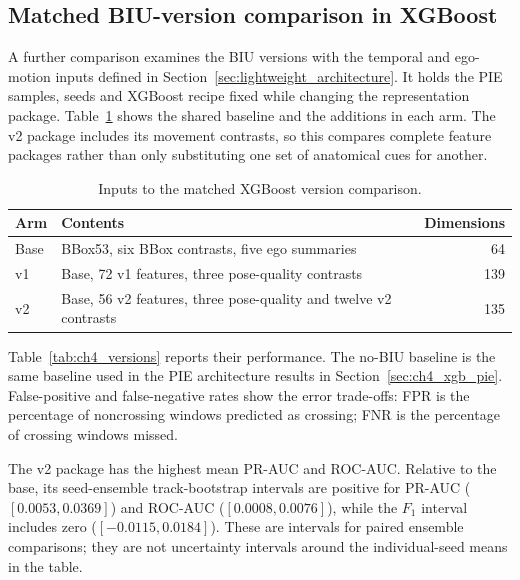 \subsection{Matched BIU-version comparison in XGBoost}\label{sec:ch4_versions}

A further comparison examines the BIU versions with the temporal and ego-motion
inputs defined in Section~\ref{sec:lightweight_architecture}. It holds the PIE samples,
seeds and XGBoost recipe fixed while changing the representation package. Table~\ref{tab:matched_xgb_arms}
shows the shared baseline and the additions in each arm. The v2 package includes
its movement contrasts, so this compares complete feature packages rather than only
substituting one set of anatomical cues for another.

\begin{table}[!htbp]
\centering
\caption{Inputs to the matched XGBoost version comparison.}
\label{tab:matched_xgb_arms}


\begin{tabularx}{\textwidth}{@{}>{\RaggedRight\arraybackslash}p{}Xr@{}}
\toprule
\textbf{Arm} & \textbf{Contents} & \textbf{Dimensions} \\[3pt]
\midrule
Base & BBox53, six BBox contrasts, five ego summaries & 64 \\[3pt]
v1 & Base, 72 v1 features, three pose-quality contrasts & 139 \\[3pt]
v2 & Base, 56 v2 features, three pose-quality and twelve v2 contrasts & 135 \\[3pt]
\bottomrule
\end{tabularx}
\end{table}


Table~\ref{tab:ch4_versions} reports their performance. The no-BIU baseline is the
same baseline used in the PIE architecture results in Section~\ref{sec:ch4_xgb_pie}. False-positive and false-negative rates
show the error trade-offs: FPR is the percentage of noncrossing windows predicted as
crossing; FNR is the percentage of crossing windows missed.


The v2 package has the highest mean PR-AUC and ROC-AUC. Relative to the base, its
seed-ensemble track-bootstrap intervals are positive for PR-AUC
($[0.0053,0.0369]$) and ROC-AUC ($[0.0008,0.0076]$), while the $F_1$ interval includes
zero ($[-0.0115,0.0184]$). These are intervals for paired ensemble comparisons; they are
not uncertainty intervals around the individual-seed means in the table.

